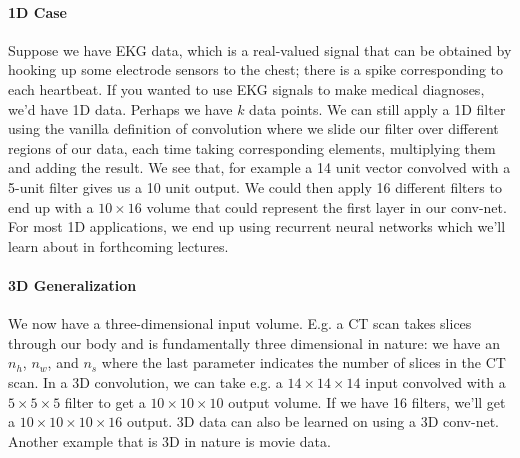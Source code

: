 \documentclass[12pt]{article}
\begin{document}
\paragraph{1D Case} Suppose we have EKG data, which is a real-valued signal that can be obtained by hooking up some electrode sensors to the chest; there is a spike corresponding to each heartbeat. If you wanted to use EKG signals to make medical diagnoses, we'd have 1D data. Perhaps we have $k$ data points. We can still apply a 1D filter using the vanilla definition of convolution where we slide our filter over different regions of our data, each time taking corresponding elements, multiplying them and adding the result. We see that, for example a 14 unit vector convolved with a 5-unit filter gives us a 10 unit output. We could then apply 16 different filters to end up with a $10 \times 16$ volume that could represent the first layer in our conv-net. For most 1D applications, we end up using recurrent neural networks which we'll learn about in forthcoming lectures.

\paragraph{3D Generalization}
We now have a three-dimensional input volume. E.g. a CT scan takes slices through our body and is fundamentally three dimensional in nature: we have an $n_h$, $n_w$, and $n_s$ where the last parameter indicates the number of slices in the CT scan. In a 3D convolution, we can take e.g. a $14 \times 14 \times 14$ input convolved with a $5 \times 5\times 5$ filter to get a $10 \times 10 \times 10$ output volume. If we have 16 filters, we'll get a $10 \times 10 \times 10 \times 16$ output. 3D data can also be learned on using a 3D conv-net. Another example that is 3D in nature is movie data.
\end{document}
